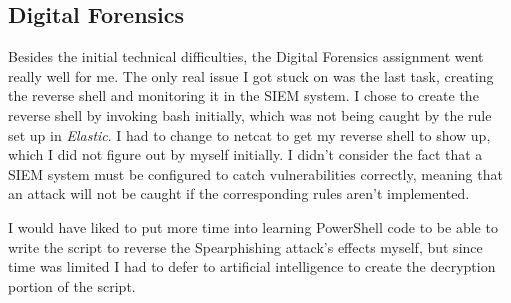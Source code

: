 \documentclass[../report.tex]{subfiles}
\begin{document}
\subsection{Digital Forensics}
Besides the initial technical difficulties, the Digital Forensics assignment went really well for me.
The only real issue I got stuck on was the last task, creating the reverse shell and monitoring it in the SIEM system. I chose to create the reverse shell by invoking bash initially, which was not being caught by the rule set up in \textit{Elastic}. I had to change to netcat to get my reverse shell to show up, which I did not figure out by myself initially. I didn't consider the fact that a SIEM system must be configured to catch vulnerabilities correctly, meaning that an attack will not be caught if the corresponding rules aren't implemented.

I would have liked to put more time into learning PowerShell code to be able to write the script to reverse the Spearphishing attack's effects myself, but since time was limited I had to defer to artificial intelligence to create the decryption portion of the script.
\end{document}
